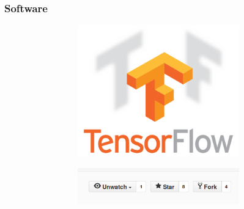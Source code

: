 \documentclass{beamer}
\begin{document}
	\begin{frame}
		\frametitle{Software}
		\begin{figure}[h]
			\centering
			\begin{subfigure}{0.47\textwidth}
				\begin{subfigure}{\textwidth}
					\includegraphics[width=\textwidth]{plots/tensorflow.png}
				\end{subfigure}
				\par \bigskip
				\begin{subfigure}{\textwidth}
					\includegraphics[width=\textwidth]{plots/github.png}
				\end{subfigure}
			\end{subfigure}
			~
			\begin{subfigure}{0.5\textwidth}

\end{subfigure}
\end{figure}
\end{frame}
\end{document}
